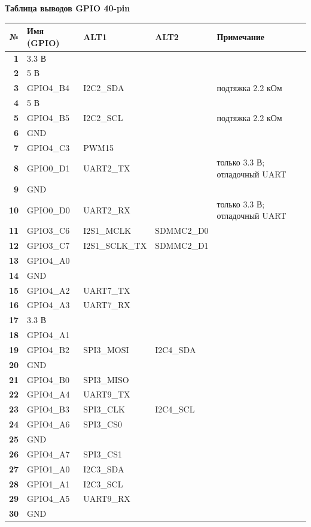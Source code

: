 \documentclass[10pt,a4paper]{article}
\begin{document}
\newpage
{\large\bfseries Таблица выводов GPIO 40-pin}\\[3pt]
\footnotesize
\renewcommand{\arraystretch}{1.12}
\begin{longtable}{@{}>{\bfseries}r l l l p{5.2cm}@{}}
\toprule
\textnormal{№} & Имя (GPIO) & ALT1 & ALT2 & Примечание \\
\midrule
\endhead
1 & 3.3 В &  &  &  \\
2 & 5 В &  &  &  \\
3 & GPIO4\_B4 & I2C2\_SDA &  & подтяжка 2.2 кОм \\
4 & 5 В &  &  &  \\
5 & GPIO4\_B5 & I2C2\_SCL &  & подтяжка 2.2 кОм \\
6 & GND &  &  &  \\
7 & GPIO4\_C3 & PWM15 &  &  \\
8 & GPIO0\_D1 & UART2\_TX &  & только 3.3 В; отладочный UART \\
9 & GND &  &  &  \\
10 & GPIO0\_D0 & UART2\_RX &  & только 3.3 В; отладочный UART \\
11 & GPIO3\_C6 & I2S1\_MCLK & SDMMC2\_D0 &  \\
12 & GPIO3\_C7 & I2S1\_SCLK\_TX & SDMMC2\_D1 &  \\
13 & GPIO4\_A0 &  &  &  \\
14 & GND &  &  &  \\
15 & GPIO4\_A2 & UART7\_TX &  &  \\
16 & GPIO4\_A3 & UART7\_RX &  &  \\
17 & 3.3 В &  &  &  \\
18 & GPIO4\_A1 &  &  &  \\
19 & GPIO4\_B2 & SPI3\_MOSI & I2C4\_SDA &  \\
20 & GND &  &  &  \\
21 & GPIO4\_B0 & SPI3\_MISO &  &  \\
22 & GPIO4\_A4 & UART9\_TX &  &  \\
23 & GPIO4\_B3 & SPI3\_CLK & I2C4\_SCL &  \\
24 & GPIO4\_A6 & SPI3\_CS0 &  &  \\
25 & GND &  &  &  \\
26 & GPIO4\_A7 & SPI3\_CS1 &  &  \\
27 & GPIO1\_A0 & I2C3\_SDA &  &  \\
28 & GPIO1\_A1 & I2C3\_SCL &  &  \\
29 & GPIO4\_A5 & UART9\_RX &  &  \\
30 & GND &  &  &  \\

\end{longtable}
\end{document}
